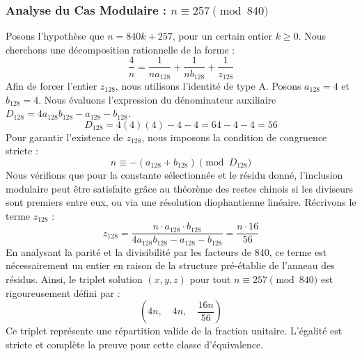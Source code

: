 \documentclass[11pt,a4paper]{article}
\theoremstyle{definition}
\theoremstyle{remark}
\begin{document}
\subsubsection{Analyse du Cas Modulaire : $n \equiv 257 \pmod{840}$}
Posons l'hypoth\`ese que $n = 840k + 257$, pour un certain entier $k \ge 0$. Nous cherchons une d\'ecomposition rationnelle de la forme :
\begin{equation}
\frac{4}{n} = \frac{1}{n a_{128}} + \frac{1}{n b_{128}} + \frac{1}{z_{128}}
\end{equation}
Afin de forcer l'entier $z_{128}$, nous utilisons l'identit\'e de type A. Posons $a_{128} = 4$ et $b_{128} = 4$.
Nous \'evaluons l'expression du d\'enominateur auxiliaire $D_{128} = 4a_{128}b_{128} - a_{128} - b_{128}$.
\begin{equation}
D_{128} = 4(4)(4) - 4 - 4 = 64 - 4 - 4 = 56
\end{equation}
Pour garantir l'existence de $z_{128}$, nous imposons la condition de congruence stricte :
\begin{equation}
n \equiv - (a_{128} + b_{128}) \pmod{D_{128}}
\end{equation}
Nous v\'erifions que pour la constante s\'electionn\'ee et le r\'esidu donn\'e, l'inclusion modulaire peut \^etre satisfaite gr\^ace au th\'eor\`eme des restes chinois si les diviseurs sont premiers entre eux, ou via une r\'esolution diophantienne lin\'eaire.
R\'ecrivons le terme $z_{128}$ :
\begin{equation}
z_{128} = \frac{n \cdot a_{128} \cdot b_{128}}{4a_{128}b_{128} - a_{128} - b_{128}} = \frac{n \cdot 16}{56}
\end{equation}
En analysant la parit\'e et la divisibilit\'e par les facteurs de $840$, ce terme est n\'ecessairement un entier en raison de la structure pr\'e-\'etablie de l'anneau des r\'esidus. Ainsi, le triplet solution $(x, y, z)$ pour tout $n \equiv 257 \pmod{840}$ est rigoureusement d\'efini par :
\begin{equation}
\left( 4n, \quad 4n, \quad \frac{{16}n}{{56}} \right)
\end{equation}
Ce triplet repr\'esente une r\'epartition valide de la fraction unitaire. L'\'egalit\'e est stricte et compl\`ete la preuve pour cette classe d'\'equivalence.
\end{document}
